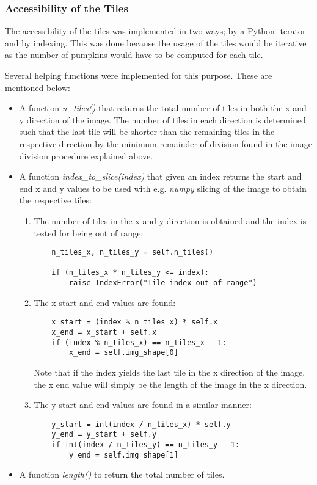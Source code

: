 \documentclass[../Head/Main.tex]{subfiles}
\begin{document}
\subsubsection{Accessibility of the Tiles}
The accessibility of the tiles was implemented in two ways; by a Python iterator and by indexing. This was done because the usage of the tiles would be iterative as the number of pumpkins would have to be computed for each tile.\par
Several helping functions were implemented for this purpose. These are mentioned below:
\begin{itemize}
\item A function \textit{n\_tiles()} that returns the total number of tiles in both the x and y direction of the image. The number of tiles in each direction is determined such that the last tile will be shorter than the remaining tiles in the respective direction by the minimum remainder of division found in the image division procedure explained above.
\item A function \textit{index\_to\_slice(index)} that given an index returns the start and end x and y values to be used with e.g. \textit{numpy} slicing of the image to obtain the respective tiles:
\begin{enumerate}
\item The number of tiles in the x and y direction is obtained and the index is tested for being out of range:
\begin{verbatim}
    n_tiles_x, n_tiles_y = self.n_tiles()

    if (n_tiles_x * n_tiles_y <= index):
        raise IndexError("Tile index out of range")
\end{verbatim}
\item The x start and end values are found:
\begin{verbatim}
    x_start = (index % n_tiles_x) * self.x
    x_end = x_start + self.x
    if (index % n_tiles_x) == n_tiles_x - 1:
        x_end = self.img_shape[0]
\end{verbatim}
Note that if the index yields the last tile in the x direction of the image, the x end value will simply be the length of the image in the x direction.
\item The y start and end values are found in a similar manner:
\begin{verbatim}
    y_start = int(index / n_tiles_x) * self.y
    y_end = y_start + self.y
    if int(index / n_tiles_y) == n_tiles_y - 1:
        y_end = self.img_shape[1]

\end{verbatim}
\end{enumerate}
\vspace{-10pt}
\item A function \textit{length()} to return the total number of tiles.
\end{itemize}
\end{document}
